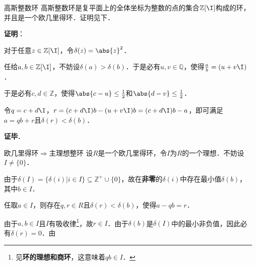\begin{example}{高斯整数环}
高斯整数环是复平面上的全体坐标为整数的点的集合$\mathbb{Z}[\I]$构成的环，并且是一个欧几里得环．证明见下．
\end{example}

\textbf{证明}：

对于任意$z\in\mathbb{Z}[\I]$，令$\delta(z)=\abs{z}^2$．

任给$a, b\in\mathbb{Z}[\I]$，不妨设$\delta(a)>\delta(b)$．于是必有$u, v\in\mathbb{Q}$，使得$\frac{a}{b}=(u+v\I)$．

于是必有$c, d\in\mathbb{Z}$，使得$\abs{c-u}\leq\frac{1}{2}$和$\abs{d-v}\leq\frac{1}{2}$．

令$q=c+d\I$，$r=(c+d\I)b-(u+v\I)b=(c+d\I)b-a$，即可满足$a=qb+r$且$\delta(r)<\delta(b)$．

\textbf{证毕}．

\begin{theorem}{欧几里得环$\Rightarrow$主理想整环}
设$R$是一个欧几里得环，令$I$为$R$的一个理想．不妨设$I\not=\{0\}$．

由于$\delta(I)=\{\delta(i)|i\in I\}\subseteq\mathbb{Z}^+\cup\{0\}$，故在\textbf{非零}的$\delta(i)$中存在最小值$\delta(b)$，其中$b\in I$．

任取$a\in I$，则存在$q, r\in R$且$\delta(r)<\delta(b)$，使得$a-qb=r$．

由于$a, b\in I$且$I$有吸收律\footnote{见\textbf{环的理想和商环}，这意味着$qb\in I$．}，故$r\in I$．由于$\delta(b)$是$\delta(I)$中的最小非负值，因此必有$\delta(r)=0$．由
\end{theorem}
